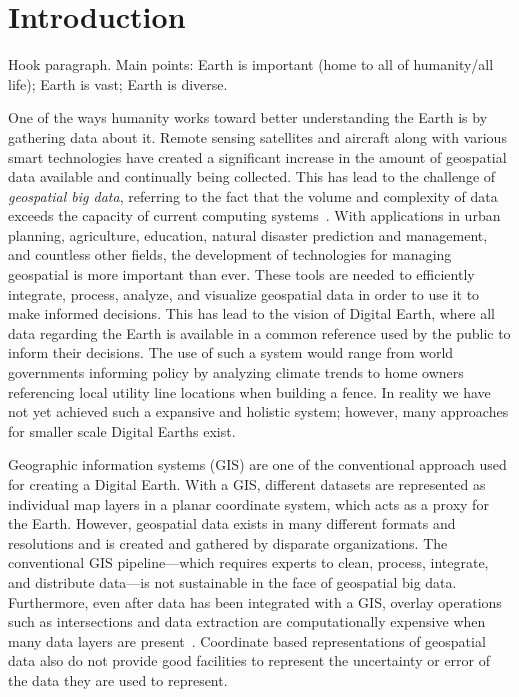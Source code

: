 \chapter{Introduction}
Hook paragraph. Main points:
Earth is important (home to all of humanity/all life);
Earth is vast;
Earth is diverse.



One of the ways humanity works toward better understanding the Earth is by gathering data about it.
Remote sensing satellites and aircraft along with various smart technologies have created a significant increase in the amount of geospatial data available and continually being collected.
This has lead to the challenge of \textit{geospatial big data}, referring to the fact that the volume and complexity of data exceeds the capacity of current computing systems~\cite{lee2015geospatial}.
With applications in urban planning, agriculture, education, natural disaster prediction and management, and countless other fields, the development of technologies for managing geospatial is more important than ever. 
These tools are needed to efficiently integrate, process, analyze, and visualize geospatial data in order to use it to make informed decisions.
This has lead to the vision of Digital Earth, where all data regarding the Earth is available in a common reference used by the public to inform their decisions.
The use of such a system would range from world governments informing policy by analyzing climate trends to home owners referencing local utility line locations when building a fence.
In reality we have not yet achieved such a expansive and holistic system; however, many approaches for smaller scale Digital Earths exist. 


Geographic information systems (GIS) are one of the conventional approach used for creating a Digital Earth.
With a GIS, different datasets are represented as individual map layers in a planar coordinate system, which acts as a proxy for the Earth.
However, geospatial data exists in many different formats and resolutions and is created and gathered by disparate organizations.
The conventional GIS pipeline---which requires experts to clean, process, integrate, and distribute data---is not sustainable in the face of geospatial big data.
Furthermore, even after data has been integrated with a GIS, overlay operations such as intersections and data extraction are computationally expensive when many data layers are present~\cite{wang2015improving}.
Coordinate based representations of geospatial data also do not provide good facilities to represent the uncertainty or error of the data they are used to represent.


